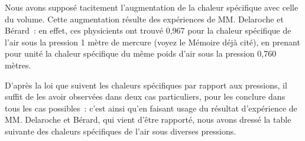 \documentclass[french,twoside]{book} %
\begin{document}
Nous avons supposé tacitement l’augmentation de la chaleur spécifique avec celle du volume. Cette augmentation résulte des expériences de MM. Delaroche et Bérard : en effet, ces physicients ont trouvé 0,967 pour la chaleur spécifique de l’air sous la pression 1 mètre de mercure (voyez le Mémoire déjà cité), en prenant pour unité la chaleur spécifique du même poids d’air sous la pression 0,760 mètres.\par
D’après la loi que suivent les chaleurs spécifiques par rapport aux pressions, il suffit de les avoir observées dans deux cas particuliers, pour les conclure dans tous les cas possibles : c’est ainsi qu’en faisant usage du résultat d’expérience de MM. Delaroche et Bérard, qui vient d’être rapporté, nous avons dressé la table suivante des chaleurs spécifiques de l’air sous diverses pressions.\par
\end{document}
